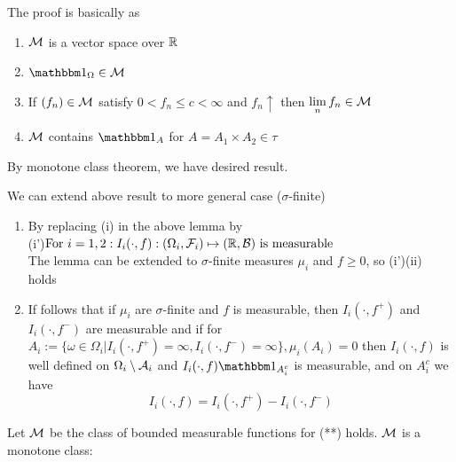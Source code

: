 The proof is basically as  
\begin{enumerate} 
    \item $\mathcal{M}$ is a vector space over $\mathbb{R}$
    \item $\I_\Omega \in \M$ 
    \item If $(f_n)\in \mathcal{M}$ satisfy $0 < f_n \leq c < \infty$ and $f_n \uparrow$ then $\lim\limits_{n} f_n \in \mathcal{M}$
    \item $\mathcal{M}$ contains $\I_A$ for $A = A_1 \times A_2 \in \tau$
\end{enumerate}By monotone class theorem, we have desired result.
\begin{rem}We can extend above result to more general case ($\sigma$-finite)
\begin{enumerate}
    \item By replacing (i) in the above lemma by \\
    (i')$\text{For } i=1,2: I_i(\cdot, f): (\Omega_i, \mathcal{F}_i) \mapsto (\mathbb{R}, \mathcal{B}) \text{ is measurable}$ \\
    The lemma can be extended to $\sigma$-finite measures $\mu_i$ and $f \geq 0$, so (i')(ii) holds
    \item If follows that if $\mu_i$ are $\sigma$-finite and $f$ is measurable, then $I_i(\cdot, f^+)$ and $I_i(\cdot, f^-)$ are measurable and if for $A_i:= \{\omega\in \Omega_i|I_i(\cdot, f^+) = \infty, I_i(\cdot, f^-)=\infty \}, \mu_i(A_i) = 0$ then $I_i(\cdot, f)$ is well defined on $\Omega_i \setminus \mathcal{A}_i$ and $I_i(\cdot, f)\I_{A_i^c}$ is measurable, and on $A_i^c$ we have 
    \begin{equation*}
        I_i(\cdot, f) = I_i(\cdot, f^+) - I_i(\cdot, f^-)
    \end{equation*}
\end{enumerate}
\end{rem}
\newpage
\pf Let $\mathcal{M}$ be the class of bounded measurable functions for (**) holds. $\mathcal{M}$ is a monotone class:
